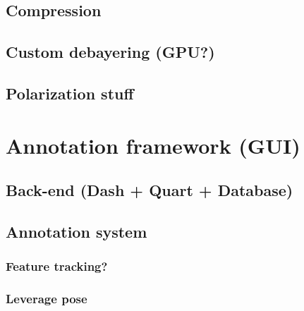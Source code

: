 \documentclass{article}
\begin{document}
\subsection{Compression}
\subsection{Custom debayering (GPU?)}
\subsection{Polarization stuff}

\section{Annotation framework (GUI)}
\subsection{Back-end (Dash + Quart + Database)}
\subsection{Annotation system}
\subsubsection{Feature tracking?}
\subsubsection{Leverage pose}
\end{document}
